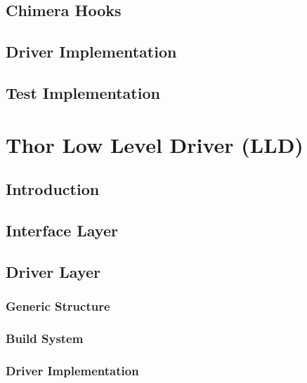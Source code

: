 \documentclass[10pt, letterpaper, tikz]{article}
\begin{document}
  \subsection{Chimera Hooks}




  \subsection{Driver Implementation}




  \subsection{Test Implementation}




  \pagebreak
  \section{Thor Low Level Driver (LLD)}
  \subsection{Introduction}

  \subsection{Interface Layer}



  \subsection{Driver Layer}

  \subsubsection{Generic Structure}

  \subsubsection{Build System}

  \subsubsection{Driver Implementation}

  \begin{lstlisting}

  \end{lstlisting}
\end{document}
